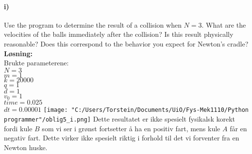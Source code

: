 \documentclass[11pt, A4paper,norsk]{article}
\begin{document}
		\paragraph{i)}
			\begin{flushleft}
Use the program to determine the result of a collision when $N = 3$. What are the velocities of the balls immediately after the collision? Is this result physically reasonable? Does this correspond to the behavior you expect for Newton’s cradle? \\
\vspace{1mm}
\textbf{Løsning:} \\
\vspace{1mm}
Brukte parameterene: \\
$N = 3$ \\
$m = 1$ \\
$k = 20000$ \\
$q = 1$ \\
$d = 1$ \\
$v_0 = 1$ \\
$time = 0.025$ \\
$dt = 0.00001$
\texttt{[image: "C:/Users/Torstein/Documents/UiO/Fys-Mek1110/Python programmer"/oblig5\_i.png]}
Dette resultatet er ikke spesielt fysikalsk korekt fordi kule $B$ som vi ser i grønst fortsetter å ha en positiv fart, mens kule $A$ får en negativ fart. Dette virker ikke spesielt riktig i forhold til det vi forventer fra en Newton huske.
			\end{flushleft}
\end{document}
